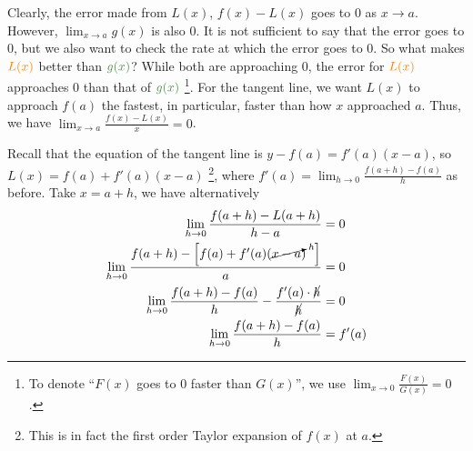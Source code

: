 \documentclass[11pt,fleqn]{book} %
\begin{document}
\begin{center}
\end{center}

Clearly, the error made from $L(x)$, $f(x) - L(x)$ goes to $0$ as $x \to a$. However, $\lim_{x\to{a}}g(x)$ is also $0$. It is not sufficient to say that the error goes to $0$, but we also want to check the rate at which the error goes to $0$. So what makes $\color{orange}L(x)$ better than $\color{DarkGreen}g(x)$? While both are approaching $0$, the error for $\color{orange} L(x)$ approaches $0$  than that of $\color{DarkGreen} g(x)$ \footnote{To denote ``$F(x)$ goes to $0$ faster than $G(x)$'', we use $\lim_{x\to0} \frac{F(x)}{G(x)} = 0$. }. For the tangent line, we want $L(x)$ to approach $f(a)$ the fastest, in particular, faster than how $x$ approached $a$. Thus, we have $\lim_{x\to{a}} \frac{f(x) - L(x)}{x} = 0$.

Recall that the equation of the tangent line is $y - f(a) = f'(a)(x - a)$, so $L(x) = f(a) + f'(a)(x - a)$ \footnote{This is in fact the first order Taylor expansion of $f(x)$ at $a$. }, where $f'(a) = \lim_{h\to0} \frac{f(a+h) - f(a)}{h}$ as before. Take $x = a + h$, we have alternatively
\begin{align*}
    \lim_{h\to0} \frac{f(a + h) - L(a + h)}{h - a}                                       & = 0     \\
    \lim_{h\to0} \frac{f(a + h) - \left[ f(a) + f'(a)(\cancelto{h}{x - a})~~ \right]}{a} & = 0     \\
    \lim_{h\to0} \frac{f(a + h) - f(a)}{h} - \frac{f'(a) \cdot \cancel{h}}{\cancel{h}}   & = 0     \\
    \lim_{h\to0} \frac{f(a + h) - f(a)}{h}                                               & = f'(a)
\end{align*}
\end{document}
